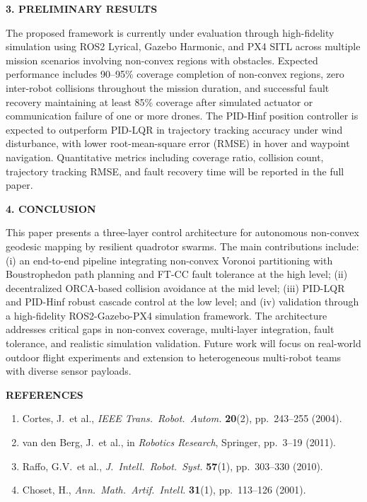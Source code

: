 \documentclass[11pt]{article}
\newcommand{\heading}[1]{%
  \vspace{1.3ex}%
  {\fontsize{10}{12}\bfseries #1}%
  \vspace{0.4ex}%
}
\newcommand{\pbody}{\fontsize{9}{11}\selectfont}
\begin{document}
\heading{3. PRELIMINARY RESULTS}

\pbody
The proposed framework is currently under evaluation through high-fidelity
simulation using ROS2 Lyrical, Gazebo Harmonic, and PX4 SITL across
multiple mission scenarios involving non-convex regions with obstacles.
Expected performance includes 90--95\% coverage completion of non-convex
regions, zero inter-robot collisions throughout the mission duration, and
successful fault recovery maintaining at least 85\% coverage after
simulated actuator or communication failure of one or more drones. The
PID-Hinf position controller is expected to outperform PID-LQR in
trajectory tracking accuracy under wind disturbance, with lower
root-mean-square error (RMSE) in hover and waypoint navigation.
Quantitative metrics including coverage ratio, collision count, trajectory
tracking RMSE, and fault recovery time will be reported in the full paper.

\heading{4. CONCLUSION}

\pbody
This paper presents a three-layer control architecture for autonomous
non-convex geodesic mapping by resilient quadrotor swarms. The main
contributions include: (i) an end-to-end pipeline integrating non-convex
Voronoi partitioning with Boustrophedon path planning and FT-CC fault
tolerance at the high level; (ii) decentralized ORCA-based collision
avoidance at the mid level; (iii) PID-LQR and PID-Hinf robust cascade
control at the low level; and (iv) validation through a high-fidelity
ROS2-Gazebo-PX4 simulation framework. The architecture addresses critical
gaps in non-convex coverage, multi-layer integration, fault tolerance, and
realistic simulation validation. Future work will focus on real-world
outdoor flight experiments and extension to heterogeneous multi-robot
teams with diverse sensor payloads.

\heading{REFERENCES}

\begin{enumerate}[leftmargin=*,labelsep=0.5em,itemsep=0pt,parsep=0pt,topsep=2pt,partopsep=0pt]
      \item {\fontsize{9}{11}\selectfont Cortes, J.\ et al., \emph{IEEE Trans.\ Robot.\ Autom.} \textbf{20}(2), pp.\ 243--255 (2004).}
      \item {\fontsize{9}{11}\selectfont van den Berg, J.\ et al., in \emph{Robotics Research}, Springer, pp.\ 3--19 (2011).}
      \item {\fontsize{9}{11}\selectfont Raffo, G.V.\ et al., \emph{J.\ Intell.\ Robot.\ Syst.} \textbf{57}(1), pp.\ 303--330 (2010).}
      \item {\fontsize{9}{11}\selectfont Choset, H., \emph{Ann.\ Math.\ Artif.\ Intell.} \textbf{31}(1), pp.\ 113--126 (2001).}
\end{enumerate}
\end{document}
